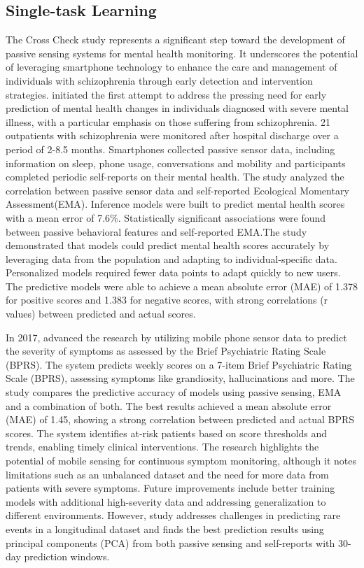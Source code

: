 \subsection{Single-task Learning}  
The Cross Check study represents a significant step toward the development of passive sensing systems for mental health monitoring. It underscores the potential of leveraging smartphone technology to enhance the care and management of individuals with schizophrenia through early detection and intervention strategies. \citet{wang2016crosscheck}  initiated the first attempt to address the pressing need for early prediction of mental health changes in individuals diagnosed with severe mental illness, with a particular emphasis on those suffering from schizophrenia. 21 outpatients with schizophrenia were monitored after hospital discharge over a period of 2-8.5 months. Smartphones collected passive sensor data, including information on sleep, phone usage, conversations and mobility and participants completed periodic self-reports on their mental health. The study analyzed the correlation between passive sensor data and self-reported Ecological Momentary Assessment(EMA). Inference models were built to predict mental health scores with a mean error of 7.6\%.  Statistically significant associations were found between passive behavioral features and self-reported EMA.The study demonstrated that models could predict mental health scores accurately by leveraging data from the population and adapting to individual-specific data. Personalized models required fewer data points to adapt quickly to new users.  The predictive models were able to achieve a mean absolute error (MAE) of 1.378 for positive scores and 1.383 for negative scores, with strong correlations (r values) between predicted and actual scores. 

In 2017,\citet{wang2017predicting} advanced the research by utilizing mobile phone sensor data to predict the severity of symptoms as assessed by the Brief Psychiatric Rating Scale (BPRS). The system predicts weekly scores on a 7-item Brief Psychiatric Rating Scale (BPRS), assessing symptoms like grandiosity, hallucinations and more. The study compares the predictive accuracy of models using passive sensing, EMA and a combination of both. The best results achieved a mean absolute error (MAE) of 1.45, showing a strong correlation between predicted and actual BPRS scores. The system identifies at-risk patients based on score thresholds and trends, enabling timely clinical interventions. The research highlights the potential of mobile sensing for continuous symptom monitoring, although it notes limitations such as an unbalanced dataset and the need for more data from patients with severe symptoms. Future improvements include better training models with additional high-severity data and addressing generalization to different environments. However, \citet{wang2020predicting} study addresses challenges in predicting rare events in a longitudinal dataset and finds the best prediction results using principal components (PCA) from both passive sensing and self-reports with 30-day prediction windows. 

